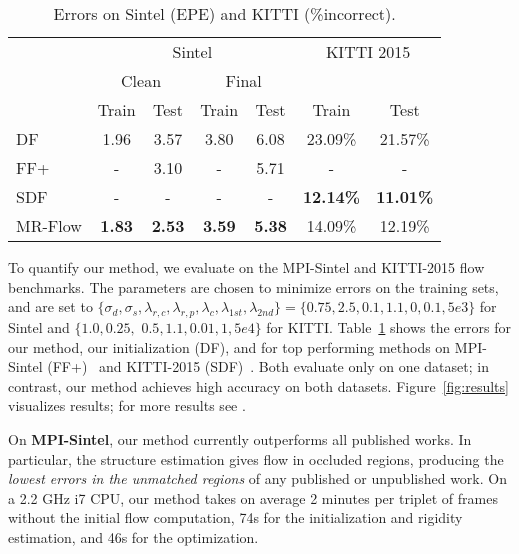 \documentclass[10pt,twocolumn,letterpaper]{article}
\begin{document}
\begin{table}
\begin{center}
\setlength{\tabcolsep}{3pt}
\begin{tabular}{lcccccc}
\toprule 
     & \multicolumn{4}{c}{Sintel} & \multicolumn{2}{c}{KITTI 2015} \\
     \cmidrule(lr){2-5} \cmidrule(lr){6-7}
     & \multicolumn{2}{c}{Clean} & \multicolumn{2}{c}{Final} & \\
     \cmidrule(lr){2-3} \cmidrule(lr){4-5}
     & Train & Test  & Train & Test & Train & Test \\
    \cmidrule(lr){2-3} \cmidrule(lr){4-5} \cmidrule(lr){6-7}
     DF~\cite{Menze2015GCPR} & 1.96 & 3.57 & 3.80 & 6.08 & 23.09\% & 21.57\%  \\
     FF+~\cite{Bailer:2015:FlowFields} & - & 3.10 & - & 5.71 & - & - \\
     SDF~\cite{Bai:2016:SemanticDeepFlow} & - & - & - & - &  {\bf 12.14\%} & {\bf 11.01\%} \\
     MR-Flow & {\bf 1.83} & {\bf 2.53} & {\bf 3.59} & {\bf 5.38} & 14.09\% & 12.19\% \\
    \bottomrule
\end{tabular}
\caption{Errors on Sintel (EPE) and KITTI (\%incorrect).}
\label{tab:errors_sintel}
\end{center}
\vspace{-0.3in}
\end{table}

\noindent
To quantify our method, we evaluate on the MPI-Sintel and KITTI-2015 flow benchmarks.
The parameters are chosen to minimize errors on the training sets, and are set to
$\lbrace \sigma_d, \sigma_s, \lambda_{r,c}, \lambda_{r,p}, \lambda_c, \lambda_{1st}, \lambda_{2nd} \rbrace = \lbrace 0.75, 2.5, 0.1, 1.1, 0, 0.1, 5e3 \rbrace$ for Sintel and $\lbrace 1.0, 0.25,$ $0.5, 1.1, 0.01, 1, 5e4 \rbrace$ for KITTI.
Table~\ref{tab:errors_sintel} shows the errors for our method,
our initialization (DF), and for top
performing methods on MPI-Sintel (FF+)~\cite{Bailer:2015:FlowFields} and
KITTI-2015 (SDF)~\cite{Bai:2016:SemanticDeepFlow}. 
Both evaluate only on one dataset; in contrast, our method achieves high accuracy on both datasets.
Figure~\ref{fig:results} visualizes results;
for more results see \cite{MRFlow:Website}.



On \textbf{MPI-Sintel}, our method currently outperforms all published works. 
In particular, the structure estimation gives flow in occluded
regions, producing the {\it lowest errors in the unmatched regions}
of any published or unpublished work.
On a 2.2 GHz i7 CPU, our method takes on average 2 minutes per triplet of frames without the initial flow computation, 74s for the initialization and rigidity estimation, and 46s for the optimization.
\end{document}
